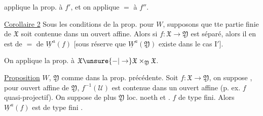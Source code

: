 applique la prop. à $f'$, et on applique $=$ à $f''$.

 \uline{Corollaire 2}
Sous les conditions de la prop. pour $W$,
 supposons que
tte partie finie de $\mathfrak X$ soit contenue dans un ouvert affine.
Alors si $f:\mathfrak X\to\mathfrak Y$ est séparé, alors il en est
de $=$ de $\underline W^a(f)$ [sous réserve que
$\underline W^a(\mathfrak Y)$ existe dans le cas $\mathrm I'$].

On applique la prop. à $\mathfrak X\unsure{-|\to}\mathfrak X\times_{\mathfrak Y}\mathfrak X$.

\uline{Proposition} $W$, $\mathfrak Y$ comme dans la prop. précédente.
Soit $f:\mathfrak X\to\mathfrak Y$, on suppose
, pour  ouvert affine
 de $\mathfrak Y$,
 $f^{-1}(\mathcal U)$ est
 contenue dans un ouvert affine
(p. ex. $f$ quasi-projectif).
On suppose de plus $\mathfrak Y$ loc. noeth et .
$f$ de type fini. 
Alors $\underline W^a(f)$ est de type fini
.
